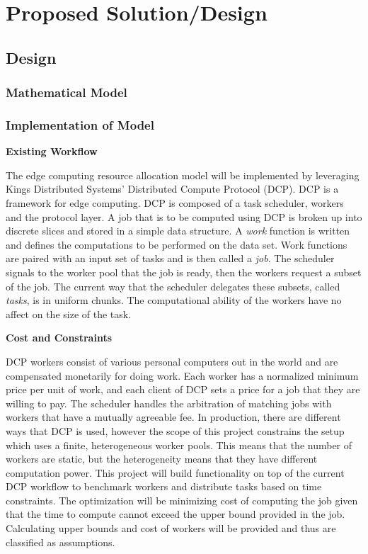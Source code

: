 \documentclass[../mthe-493-project-proposal.tex]{subfiles}
\begin{document}
    \chapter{Proposed Solution/Design}
    \label{ch:proposed-design}
    \blindtext

    \section{Design}
    \blindtext

    \subsection{Mathematical Model}
    \blindtext

    \subsection{Implementation of Model}
    \textbf{Existing Workflow}

    The edge computing resource allocation model will be implemented by leveraging  Kings Distributed Systems' Distributed Compute Protocol (DCP). DCP is a framework for edge computing. DCP is composed of a task scheduler, workers and the protocol layer. A job that is to be computed using DCP is broken up into discrete slices and stored in a simple data structure. A \emph{work} function is written and defines the computations to be performed on the data set. Work functions are paired with an input set of tasks and is then called a \emph{job}. The scheduler signals to the worker pool that the job is ready, then the workers request a subset of the job. The current way that the scheduler delegates these subsets, called \emph{tasks}, is in uniform chunks. The computational ability of the workers have no affect on the size of the task.

    \textbf{Cost and Constraints}

    DCP workers consist of various personal computers out in the world and are compensated monetarily for doing work. Each worker has a normalized minimum price per unit of work, and each client of DCP sets a price for a job that they are willing to pay. The scheduler handles the arbitration of matching jobs with workers that have a mutually agreeable fee. In production, there are different ways that DCP is used, however the scope of this project constrains the setup which uses a finite, heterogeneous worker pools. This means that the number of workers are static, but the heterogeneity means that they have different computation power. This project will build functionality on top of the current DCP workflow to benchmark workers and distribute tasks based on time constraints. The optimization will be minimizing cost of computing the job given that the time to compute cannot exceed the upper bound provided in the job. Calculating upper bounds and cost of workers will be provided and thus are classified as assumptions.
\end{document}
